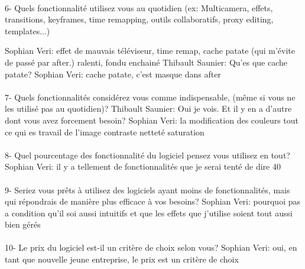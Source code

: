         \paragraph{}
         6-  Quels fonctionnalité utilisez vous au quotidien (ex: Multicamera, effets,
              transitions, keyframes, time remapping, outils collaboratifs, proxy
              editing, templates...)

            Sophian Veri: effet de mauvais téléviseur, time remap, cache patate (qui m'évite
            de passé par after.) ralenti, fondu enchainé
            Thibault Saunier: Qu'es que cache patate?
            Sophian Veri: cache patate, c'est masque dans after

        \paragraph{}
          7-  Quels fonctionnalités considérez vous comme indispensable, (même si vous
                ne les utilisé pas au quotidien)?
            Thibault Saunier: Oui je vois. Et il y en a d'autre dont vous avez forcement besoin?
            Sophian Veri: la modification des couleurs  tout ce qui es travail de
            l'image contraste netteté saturation

        \paragraph{}
          8- Quel pourcentage des fonctionnalité du logiciel pensez vous utilisez
                en tout?
              Sophian Veri: il y a  tellement de fonctionnalités que je serai tenté
              de dire 40%

        \paragraph{}
          9- Seriez vous prêts à utilisez des logiciels ayant moins de fonctionnalités,
                mais qui répondrais de manière plus efficace à vos besoins?
              Sophian Veri: pourquoi pas a condition qu'il soi aussi intuitifs et que les effets
              que j'utilise soient tout aussi bien gérés

        \paragraph{}
          10-  Le prix du logiciel est-il un critère de choix selon vous?
              Sophian Veri: oui, en tant que nouvelle jeune entreprise, le prix est
              un critère de choix

